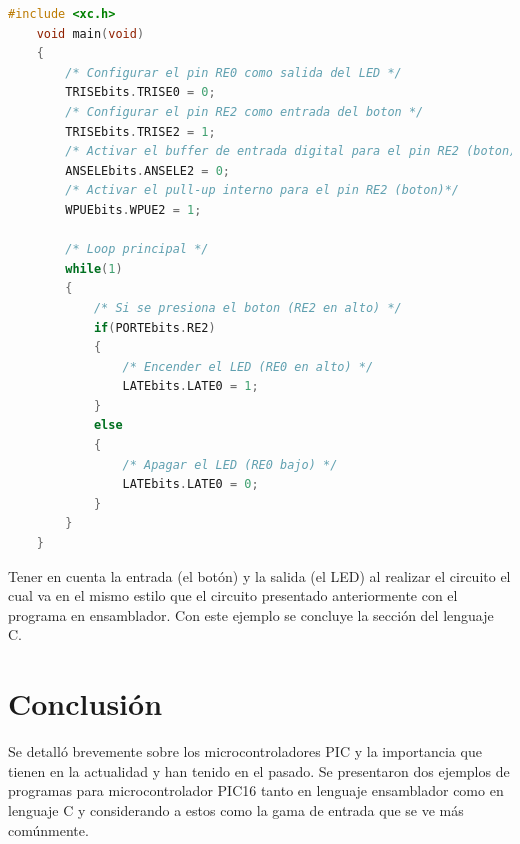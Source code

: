 \documentclass[conference]{IEEEtran}
\begin{document}
    \begin{lstlisting}[language=C, caption=Encender el LED al presionar el
    botón (con unión de bit)]
    #include <xc.h>
    void main(void)
    {
        /* Configurar el pin RE0 como salida del LED */
        TRISEbits.TRISE0 = 0;
        /* Configurar el pin RE2 como entrada del boton */
        TRISEbits.TRISE2 = 1;
        /* Activar el buffer de entrada digital para el pin RE2 (boton) */
        ANSELEbits.ANSELE2 = 0;
        /* Activar el pull-up interno para el pin RE2 (boton)*/
        WPUEbits.WPUE2 = 1;

        /* Loop principal */
        while(1)
        {
            /* Si se presiona el boton (RE2 en alto) */
            if(PORTEbits.RE2)
            {
                /* Encender el LED (RE0 en alto) */
                LATEbits.LATE0 = 1;
            }
            else
            {
                /* Apagar el LED (RE0 bajo) */
                LATEbits.LATE0 = 0;
            }
        }
    }
\end{lstlisting}

Tener en cuenta la entrada (el botón) y la salida (el LED) al realizar el
circuito el cual va en el mismo estilo que el circuito presentado
anteriormente con el programa en ensamblador. Con este ejemplo se concluye la
sección del lenguaje C.

\section{Conclusión}

Se detalló brevemente sobre los microcontroladores PIC y la importancia que
tienen en la actualidad y han tenido en el pasado. Se presentaron dos
ejemplos de programas para microcontrolador PIC16 tanto en lenguaje
ensamblador como en lenguaje C y considerando a estos como la gama de entrada
que se ve más comúnmente.

\printbibliography
\end{document}
